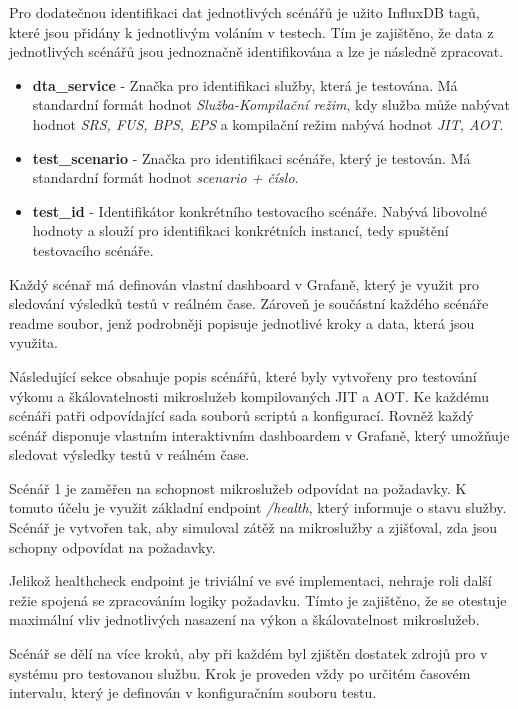 Pro dodatečnou identifikaci dat jednotlivých scénářů je užito InfluxDB tagů, které jsou přidány k jednotlivým voláním v testech. Tím je zajištěno, že data z jednotlivých scénářů jsou jednoznačně identifikována a lze je následně zpracovat. 

\begin{itemize}
    \item \textbf{dta\_service} - Značka pro identifikaci služby, která je testována. Má standardní formát hodnot \emph{Služba-Kompilační režim}, kdy služba může nabývat hodnot \emph{SRS, FUS, BPS, EPS} a kompilační režim nabývá hodnot \emph{JIT, AOT}.
    \item \textbf{test\_scenario} - Značka pro identifikaci scénáře, který je testován. Má standardní formát hodnot \emph{scenario 
    + číslo}.
    \item \textbf{test\_id} - Identifikátor konkrétního testovacího scénáře. Nabývá libovolné hodnoty a slouží pro identifikaci konkrétních instancí, tedy spuštění testovacího scénáře.
\end{itemize}

Každý scénař má definován vlastní dashboard v Grafaně, který je využit pro sledování výsledků testů v reálném čase. Zároveň je součástní každého scénáře readme soubor, jenž podrobněji popisuje jednotlivé kroky a data, která jsou využita.


Následující sekce obsahuje popis scénářů, které byly vytvořeny pro testování výkonu a škálovatelnosti mikroslužeb kompilovaných JIT a AOT. Ke každému scénáři patři odpovídající sada souborů scriptů a konfigurací. Rovněž každý scénář disponuje vlastním interaktivním dashboardem v Grafaně, který umožňuje sledovat výsledky testů v reálném čase.


Scénář 1 je zaměřen na schopnost mikroslužeb odpovídat na požadavky. K tomuto účelu je využit základní endpoint \emph{/health}, který informuje o stavu služby. Scénář je vytvořen tak, aby simuloval zátěž na mikroslužby a zjišťoval, zda jsou schopny odpovídat na požadavky.

Jelikož healthcheck endpoint je triviální ve své implementaci, nehraje roli další režie spojená se zpracováním logiky požadavku. Tímto je zajištěno, že se otestuje maximální vliv jednotlivých nasazení na výkon a škálovatelnost mikroslužeb.

Scénář se dělí na více kroků, aby při každém byl zjištěn dostatek zdrojů pro v systému pro testovanou službu. Krok je proveden vždy po určitém časovém intervalu, který je definován v konfiguračním souboru testu.

